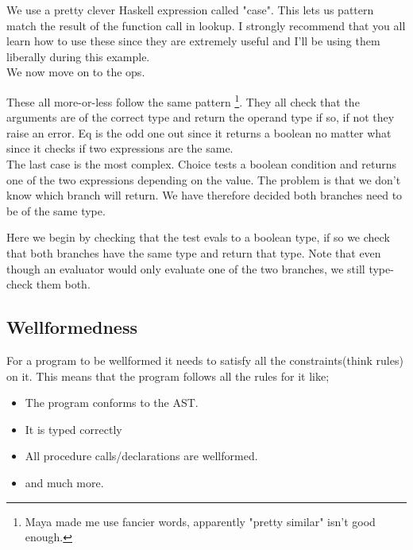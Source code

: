         We use a pretty clever Haskell expression called "case". This lets us pattern match the result of the function call in lookup. 
        I strongly recommend that you all learn how to use these since they are extremely useful and I'll be using them liberally during this example.\\
        We now move on to the ops.
        
        
        These all more-or-less follow the same pattern \footnote{Maya made me use fancier words, apparently "pretty similar" isn't good enough.}.
        They all check that the arguments are of the correct type and return the operand type if so, if not they raise an error.
        Eq is the odd one out since it returns a boolean no matter what since it checks if two expressions are the same.\\
        The last case is the most complex. Choice tests a boolean condition and returns one of the two expressions depending on the value.
        The problem is that we don't know which branch will return. We have therefore decided both branches need to be of the same type.
        
           
        Here we begin by checking that the test evals to a boolean type, if so we check that both branches have the same type and return that type.
        Note that even though an evaluator would only evaluate one of the two branches, we still type-check them both.
        
        
        \subsection{Wellformedness}
            For a program to be \gls{wellformed} it needs to satisfy all the constraints(think rules) on it. This means that the program follows all the rules 
            for it like; 
            \begin{itemize}
                \item The program conforms to the AST.
                \item It is typed correctly
                \item All procedure calls/declarations are wellformed.
                \item and much more.
            \end{itemize}

